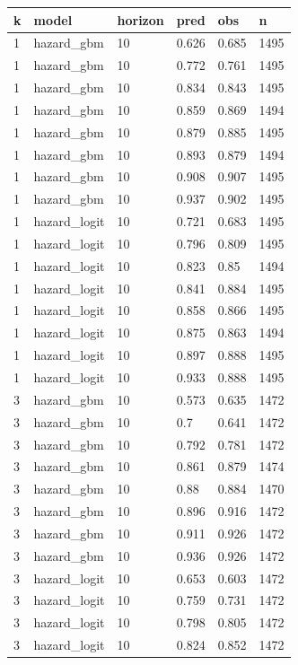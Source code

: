 \begin{tabular}{llllll}
\toprule
k & model & horizon & pred & obs & n \\
\midrule
1 & hazard\_gbm & 10 & 0.626 & 0.685 & 1495 \\
1 & hazard\_gbm & 10 & 0.772 & 0.761 & 1495 \\
1 & hazard\_gbm & 10 & 0.834 & 0.843 & 1495 \\
1 & hazard\_gbm & 10 & 0.859 & 0.869 & 1494 \\
1 & hazard\_gbm & 10 & 0.879 & 0.885 & 1495 \\
1 & hazard\_gbm & 10 & 0.893 & 0.879 & 1494 \\
1 & hazard\_gbm & 10 & 0.908 & 0.907 & 1495 \\
1 & hazard\_gbm & 10 & 0.937 & 0.902 & 1495 \\
1 & hazard\_logit & 10 & 0.721 & 0.683 & 1495 \\
1 & hazard\_logit & 10 & 0.796 & 0.809 & 1495 \\
1 & hazard\_logit & 10 & 0.823 & 0.85 & 1494 \\
1 & hazard\_logit & 10 & 0.841 & 0.884 & 1495 \\
1 & hazard\_logit & 10 & 0.858 & 0.866 & 1495 \\
1 & hazard\_logit & 10 & 0.875 & 0.863 & 1494 \\
1 & hazard\_logit & 10 & 0.897 & 0.888 & 1495 \\
1 & hazard\_logit & 10 & 0.933 & 0.888 & 1495 \\
3 & hazard\_gbm & 10 & 0.573 & 0.635 & 1472 \\
3 & hazard\_gbm & 10 & 0.7 & 0.641 & 1472 \\
3 & hazard\_gbm & 10 & 0.792 & 0.781 & 1472 \\
3 & hazard\_gbm & 10 & 0.861 & 0.879 & 1474 \\
3 & hazard\_gbm & 10 & 0.88 & 0.884 & 1470 \\
3 & hazard\_gbm & 10 & 0.896 & 0.916 & 1472 \\
3 & hazard\_gbm & 10 & 0.911 & 0.926 & 1472 \\
3 & hazard\_gbm & 10 & 0.936 & 0.926 & 1472 \\
3 & hazard\_logit & 10 & 0.653 & 0.603 & 1472 \\
3 & hazard\_logit & 10 & 0.759 & 0.731 & 1472 \\
3 & hazard\_logit & 10 & 0.798 & 0.805 & 1472 \\
3 & hazard\_logit & 10 & 0.824 & 0.852 & 1472 \\

\end{tabular}
